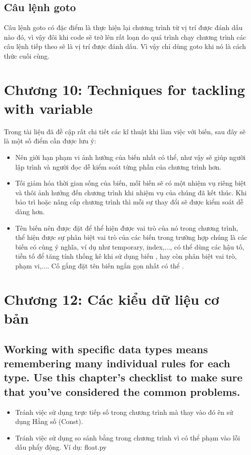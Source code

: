 \documentclass{article}
\begin{document}
    \subsection{Câu lệnh goto}\textbf{}
    Câu lệnh goto có đặc điểm là thực hiện lại chương trình từ vị trí được đánh dấu nào đó, vì vậy đôi khi code sẽ trở lên rất loạn do quá trình chạy chương trình các câu lệnh tiếp theo sẽ là vị trí được đánh dấu. Vì vậy chỉ dùng goto khi nó là cách thức cuối cùng.
    
    \section{Chương 10: Techniques for tackling with variable  }
    Trong tài liệu đã đề cập rất chi tiết các kĩ thuật khi làm việc với biến, sau đây sẽ là một số điểm cần được lưu ý:
    \begin{itemize}
        \item Nên giới hạn phạm vi ảnh hưởng của biến nhất có thể, như vậy sẽ giúp người lập trình và người đọc dễ kiểm soát từng phần của chương trình hơn.
        \item Tối giảm hóa thời gian sống của biến, mốĩ biến sẽ có một nhiệm vụ riêng biệt và thôi ảnh hưởng đến chương trình khi nhiệm vụ của chúng đã kết thúc. Khi bảo trì hoặc nâng cấp chương trình thì mỗi sự thay đổi sẽ được kiểm soát dễ dàng hơn.
        \item Tên biến nên được đặt để thể hiện được vai trò của nó trong chương trình, thể hiện được sự phân biệt vai trò của các biến trong trường hợp chúng là các biến có cùng ý nghĩa, ví dụ như temporary, index,..., có thể dùng các hậu tố, tiền tố để tăng tính thống kê khi sử dụng biến , hay còn phân biệt vai trò, phạm vi,.... Cố gắng đặt tên biến ngắn gọn nhất có thể .
    \end{itemize}
    
\section{Chương 12: Các kiểu dữ liệu cơ bản}
    \subsection{Working with specific data types means remembering many individual rules for each type. Use this chapter's checklist to make sure that you've considered the common problems.}
    \begin{itemize}
        \item Tránh việc sử dụng trực tiếp số trong chương trình mà thay  vào đó ên sử dụng Hằng số (Const).
        \item Tránh việc sử dụng so sánh bằng trong chương trình vì có thể phạm vào lỗi dấu phẩy động. Ví dụ: float.py
    \end{itemize}
    
\end{document}
